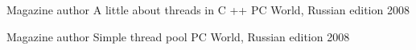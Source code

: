 

\begin{cventries}

  \cventry
    {Magazine author} %
    {A little about threads in C ++} %
    {PC World, Russian edition} %
    {2008}
    {
    }

  \cventry
    {Magazine author} %
    {Simple thread pool} %
    {PC World, Russian edition} %
    {2008}
    {
    }

\end{cventries}
